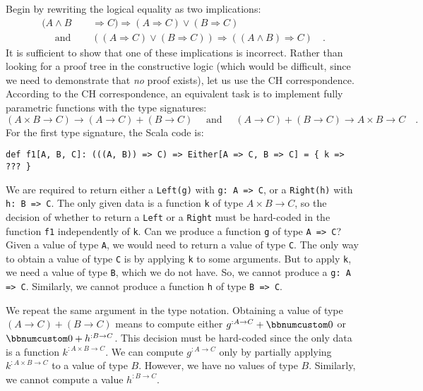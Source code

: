 Begin by rewriting the logical equality as two implications:
\begin{align*}
(A\wedge B & \Rightarrow C)\Rightarrow(A\Rightarrow C)\vee(B\Rightarrow C)\\
\quad\text{ and }\quad & \left((A\Rightarrow C)\vee(B\Rightarrow C)\right)\Rightarrow\left(\left(A\wedge B\right)\Rightarrow C\right)\quad.
\end{align*}
It is sufficient to show that one of these implications is incorrect.
Rather than looking for a proof tree in the constructive logic (which
would be difficult, since we need to demonstrate that \emph{no} proof
exists), let us use the CH correspondence. According to the CH correspondence,
an equivalent task is to implement fully parametric functions with
the type signatures:
\[
(A\times B\rightarrow C)\rightarrow(A\rightarrow C)+(B\rightarrow C)\quad\text{ and }\quad(A\rightarrow C)+(B\rightarrow C)\rightarrow A\times B\rightarrow C\quad.
\]
For the first type signature, the Scala code is:
\begin{lstlisting}
def f1[A, B, C]: (((A, B)) => C) => Either[A => C, B => C] = { k => ??? }
\end{lstlisting}
We are required to return either a \lstinline!Left(g)! with \lstinline!g: A => C!,
or a \lstinline!Right(h)! with \lstinline!h: B => C!. The only given
data is a function \lstinline!k! of type $A\times B\rightarrow C$,
so the decision of whether to return a \lstinline!Left! or a \lstinline!Right!
must be hard-coded in the function \lstinline!f1! independently of
\lstinline!k!. Can we produce a function \lstinline!g! of type \lstinline!A => C!?
Given a value of type \lstinline!A!, we would need to return a value
of type \lstinline!C!. The only way to obtain a value of type \lstinline!C!
is by applying \lstinline!k! to some arguments. But to apply \lstinline!k!,
we need a value of type \lstinline!B!, which we do not have. So,
we cannot produce a \lstinline!g: A => C!. Similarly, we cannot produce
a function \lstinline!h! of type \lstinline!B => C!.

We repeat the same argument in the type notation. Obtaining a value
of type $(A\rightarrow C)+(B\rightarrow C)$ means to compute either
$g^{:A\rightarrow C}+\bbnum 0$ or $\bbnum 0+h^{:B\rightarrow C}$.
This decision must be hard-coded since the only data is a function
$k^{:A\times B\rightarrow C}$. We can compute $g^{:A\rightarrow C}$
only by partially applying $k^{:A\times B\rightarrow C}$ to a value
of type $B$. However, we have no values of type $B$. Similarly,
we cannot compute a value $h^{:B\rightarrow C}$.

